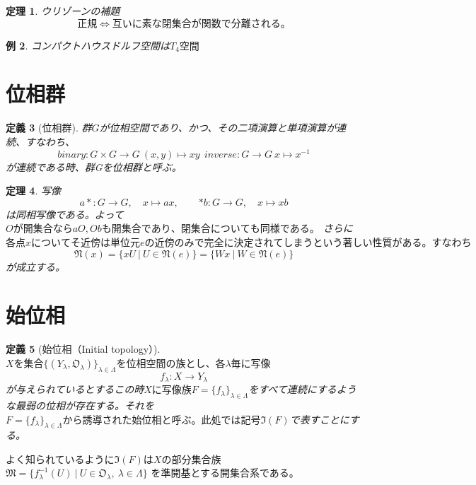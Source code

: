 \documentclass[leqno]{jsarticle}
\newtheorem{thm}{定理}
\newtheorem{df}[thm]{定義}
\newtheorem{exam}[thm]{例}
\begin{document}
\begin{thm}ウリゾーンの補題\\
\[
正規\Leftrightarrow 互いに素な閉集合が関数で分離される。
\]
\end{thm}


\begin{exam}コンパクトハウスドルフ空間は$T_{4}空間$
\end{exam}


\section{位相群}
\begin{df}[位相群]
群$G$が位相空間であり、かつ、その二項演算と単項演算が連続、すなわち、
\[
binary:G\times G\rightarrow G\ (x,y)\mapsto xy\ \ inverse:G\rightarrow G\ x\mapsto x^{-1}
\]が連続である時、群Gを位相群と呼ぶ。
\end{df}
\begin{thm}
写像
\[
\mathord{a\ast}\colon G\rightarrow G,\quad x\mapsto ax,\qquad \mathord{\ast b}\colon G\rightarrow G,\quad x\mapsto xb
\]は同相写像である。よって$Oが開集合ならaO,Obも開集合であり、閉集合についても同様である。$
さらに$各点xについてそ近傍は単位元eの近傍のみで完全に決定されてしまうという著しい性質がある。すなわち$
\[
\mathfrak{N}(x)=\{xU\ |\ U\in \mathfrak{N}(e)\}=\{Wx\ |\ W\in \mathfrak{N}(e)\}
\]が成立する。
\end{thm}

\section{始位相}
\begin{df}[始位相（Initial topology）]
$Xを集合\{(Y_{\lambda},\mathfrak{O}_{\lambda})\}_{\lambda \in \Lambda}を位相空間の族とし、各\lambda 毎に写像$
\[
f_{\lambda}:X\rightarrow Y_{\lambda}
\]が与えられているとするこの時$Xに写像族F=\{f_{\lambda}\}_{\lambda \in \Lambda}$をすべて連続にするような最弱の位相が存在する。それを$F=\{f_{\lambda}\}_{\lambda \in \Lambda}から誘導された始位相と呼ぶ。此処では記号\mathfrak{I}(F)$で表すことにする。
\end{df}
よく知られているように$\mathfrak{I}(F)$は$X$の部分集合族
$\mathfrak{M}=\{f_{\lambda}^{-1}(U)\ |\ U\in \mathfrak{O}_{\lambda},\ \lambda\in \Lambda \}$
を準開基とする開集合系である。
\end{document}
